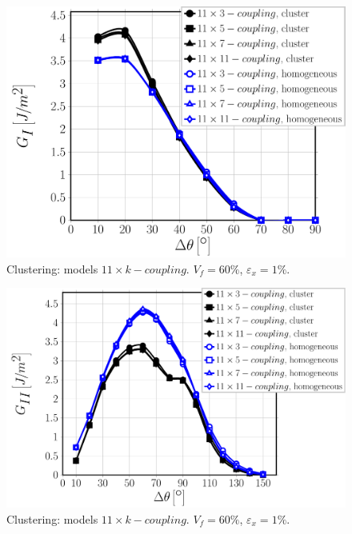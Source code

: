 \documentclass[review]{elsarticle}
\begin{document}
\begin{figure}[!h]
\centering
\includegraphics[width=\textwidth]{11xk-coupling-vf60-GI.pdf}
\caption{Clustering: models $11\times k-coupling$. $V_{f}=60\%$, $\varepsilon_{x}=1\%$.}\label{fig:debonddebondGI}
\end{figure}

\begin{figure}[!h]
\centering
\includegraphics[width=\textwidth]{11xk-coupling-vf60-GII.pdf}
\caption{Clustering: models $11\times k-coupling$. $V_{f}=60\%$, $\varepsilon_{x}=1\%$.}\label{fig:debonddebondGI}
\end{figure}
\end{document}
